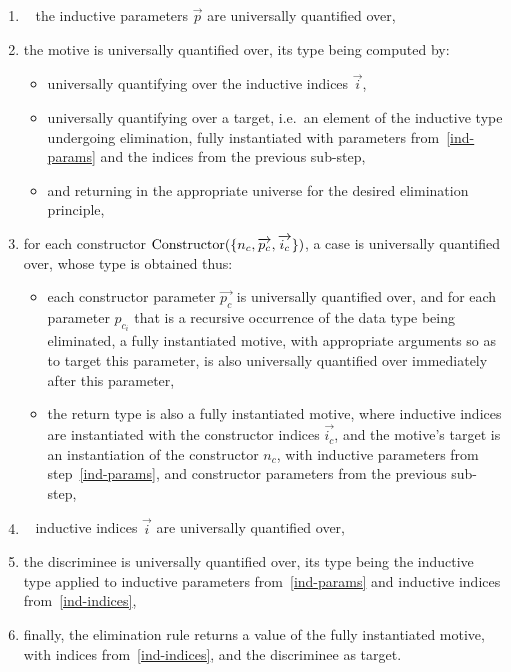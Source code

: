 \begin{enumerate}[label=\protect\circled{\arabic*}]

\item~\label{ind-params} the inductive parameters $\overrightarrow{p}$ are
universally quantified over,

\item the motive  is universally quantified over, its type being
computed by:

\begin{itemize}

\item universally quantifying over the inductive indices $\overrightarrow{i}$,

\item universally quantifying over a target, i.e.\ an element of the inductive
type undergoing elimination, fully instantiated with parameters
from~\ref{ind-params} and the indices from the previous sub-step,

\item and returning in the appropriate universe for the desired elimination
principle,

\end{itemize}

\item for each constructor
$\text{Constructor}(\{ n_c, \overrightarrow{p_c}, \overrightarrow{i_c} \})$, a case is
universally quantified over, whose type is obtained thus:

\begin{itemize}

\item each constructor parameter $\overrightarrow{p_c}$ is
universally quantified over, and for each parameter $p_{c_i}$ that is a
recursive occurrence of the data type being eliminated, a fully instantiated
motive, with appropriate arguments so as to target this parameter, is also
universally quantified over immediately after this parameter,

\item the return type is also a fully instantiated motive, where inductive
indices are instantiated with the constructor indices $\overrightarrow{i_c}$,
and the motive's target is an instantiation of the constructor $n_c$, with
inductive parameters from step~\ref{ind-params}, and constructor parameters from
the previous sub-step,

\end{itemize}

\item~\label{ind-indices} inductive indices $\overrightarrow{i}$ are
universally quantified over,

\item the discriminee is universally quantified over, its type being the
inductive type applied to inductive parameters from~\ref{ind-params} and
inductive indices from~\ref{ind-indices},

\item finally, the elimination rule returns a value of the fully instantiated
motive, with indices from~\ref{ind-indices}, and the discriminee as target.

\end{enumerate}

